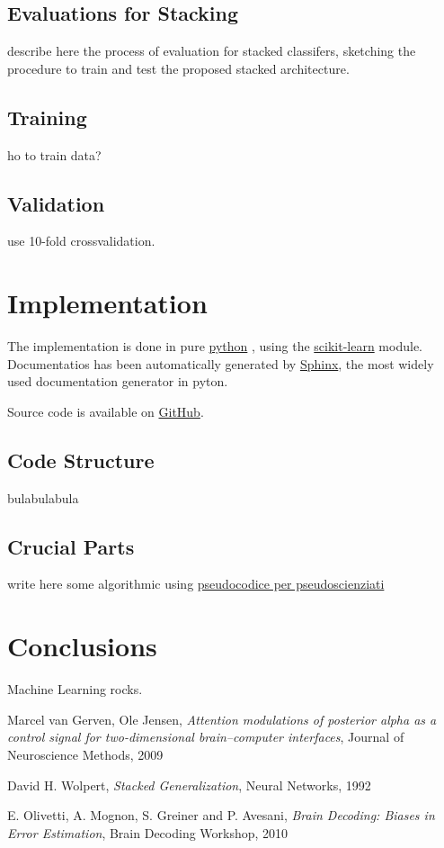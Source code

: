 \documentclass[10pt]{article}
\begin{document}
\subsection{Evaluations for Stacking}
describe here the process of evaluation for stacked classifers, sketching the procedure to train and test the proposed stacked architecture.


\subsection{Training}
ho to train data?


\subsection{Validation}
use 10-fold crossvalidation.



\section{Implementation}
The implementation is done in pure 
\href{https://python.org/}{python}
, using the
\href{http://scikit-learn.org/stable/}{scikit-learn}
module. Documentatios has been automatically generated by
\href{http://sphinx-doc.org/}{Sphinx}, the most widely used documentation generator in pyton.

Source code is available on 
\href{https://github.com/mmaker/braindecoding}{GitHub}.

\subsection{Code Structure}
bulabulabula
\subsection{Crucial Parts}
write here some algorithmic using \href{https://en.wikibooks.org/wiki/LaTeX/Algorithms_and_Pseudocode}{pseudocodice per pseudoscienziati}


\section{Conclusions}
Machine Learning rocks.

\begin{thebibliography}{9}

Marcel van Gerven, Ole Jensen,
\emph{Attention modulations of posterior alpha as a control signal for two-dimensional brain–computer interfaces},
Journal of Neuroscience Methods, 2009


David H. Wolpert,
\emph{Stacked Generalization},
Neural Networks, 1992

E. Olivetti, A. Mognon, S. Greiner and P. Avesani, 
\emph{Brain Decoding: Biases in Error Estimation}, 
Brain Decoding Workshop, 2010

\end{thebibliography}
\end{document}
